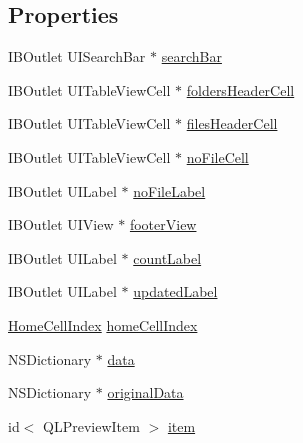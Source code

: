 \subsection*{Properties}
\begin{DoxyCompactItemize}
\item 
I\-B\-Outlet U\-I\-Search\-Bar $\ast$ \hyperlink{interface_w_list_view_controller_aca3cbb57edb2f70fa1d4b86e8e93b94f}{search\-Bar}
\item 
I\-B\-Outlet U\-I\-Table\-View\-Cell $\ast$ \hyperlink{interface_w_list_view_controller_a9889acb567454fd1b4ef9c3a6b509e00}{folders\-Header\-Cell}
\item 
I\-B\-Outlet U\-I\-Table\-View\-Cell $\ast$ \hyperlink{interface_w_list_view_controller_a2fb85830db8a195b3aeeaf760b5a50e3}{files\-Header\-Cell}
\item 
I\-B\-Outlet U\-I\-Table\-View\-Cell $\ast$ \hyperlink{interface_w_list_view_controller_a61b0a81e0bf2cbe40a00886251799615}{no\-File\-Cell}
\item 
I\-B\-Outlet U\-I\-Label $\ast$ \hyperlink{interface_w_list_view_controller_a404c52a704b0e42d4a5ebc9af5127565}{no\-File\-Label}
\item 
I\-B\-Outlet U\-I\-View $\ast$ \hyperlink{interface_w_list_view_controller_aeaf9e4a4756ed922ff2bcbaf0da14906}{footer\-View}
\item 
I\-B\-Outlet U\-I\-Label $\ast$ \hyperlink{interface_w_list_view_controller_ae47c50d177c62027f4e7bd1778e61234}{count\-Label}
\item 
I\-B\-Outlet U\-I\-Label $\ast$ \hyperlink{interface_w_list_view_controller_a62a75c3e41c927a0c9554d91bfc7879a}{updated\-Label}
\item 
\hyperlink{_w_home_view_controller_8h_af693adb781d3a9619a4217eaf2ec3905}{Home\-Cell\-Index} \hyperlink{interface_w_list_view_controller_adc60906bbf6f68dac54f4e1784713321}{home\-Cell\-Index}
\item 
N\-S\-Dictionary $\ast$ \hyperlink{interface_w_list_view_controller_afd471cea90b7ed01fc284430d6788f75}{data}
\item 
N\-S\-Dictionary $\ast$ \hyperlink{interface_w_list_view_controller_af8aea1fcb887c3fc3d497e27445156e2}{original\-Data}
\item 
id$<$ Q\-L\-Preview\-Item $>$ \hyperlink{interface_w_list_view_controller_a30290d3bd965cec6603fd263094871f5}{item}
\end{DoxyCompactItemize}


